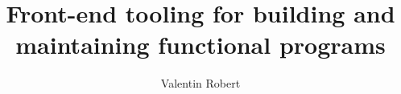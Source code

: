 \documentclass[12pt]{ucsddissertation}
\title{Front-end tooling for building and maintaining functional programs}
\author{Valentin Robert}
\begin{document}
\frontmatter
\maketitle
\makecopyright
\makesignature




\end{document}
